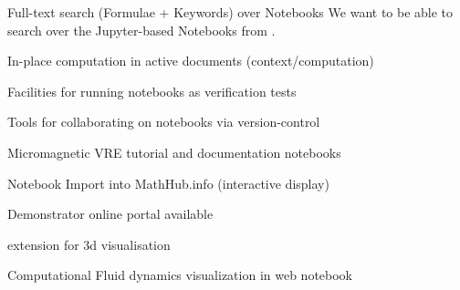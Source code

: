 \begin{workpackage}
\begin{wpdelivs}
    \begin{wpdeliv}[id=notebooksearch,due=18,nature=OTHER,dissem=PU,lead=JU]
      {Full-text search (Formulae + Keywords) over Notebooks}
      We want to be able to search over the Jupyter-based Notebooks from
      .
\end{wpdeliv}
    \begin{wpdeliv}[id=adcomp,due=18,nature=DEM,dissem=PU,lead=JU]
      {In-place computation in active documents (context/computation)}
    \end{wpdeliv}

  \begin{wpdeliv}[due=18,id=jupyter-test,dissem=PU,nature=OTHER,lead=SR]
      {Facilities for running notebooks as verification tests}
  \end{wpdeliv}

  \begin{wpdeliv}[due=12,id=jupyter-collab,dissem=PU,nature=OTHER,lead=SR]
      {Tools for collaborating on notebooks via version-control}
  \end{wpdeliv}
    \begin{wpdeliv}[due=21,id=oommf-nb-documentation,dissem=PU,nature=DEM,lead=USO]
      {Micromagnetic VRE tutorial and documentation notebooks}
    \end{wpdeliv}
    \begin{wpdeliv}[id=jupyter-import,due=24,nature=DEM,dissem=PU,lead=JU]
      {Notebook Import into MathHub.info (interactive display)}
    \end{wpdeliv}
    \begin{wpdeliv}[due=24,id=oommf-nb-tmp,dissem=PU,nature=DEC,lead=USO]
      {Demonstrator online portal available}
    \end{wpdeliv}
  \begin{wpdeliv}[due=24,id=vis3d,dissem=PU,nature=OTHER,lead=SR]
      {\Jupyter extension for 3d visualisation}
  \end{wpdeliv}
  \begin{wpdeliv}[due=36,id=cfd-vis,dissem=PU,nature=OTHER,lead=SR]
      {Computational Fluid dynamics visualization in web notebook}
  \end{wpdeliv}


\end{wpdelivs}
\end{workpackage}
